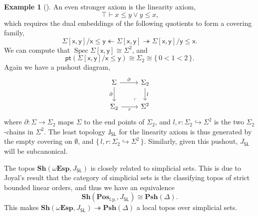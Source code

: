 \documentclass[a4paper,12pt]{amsart}
\theoremstyle{definition}
\newtheorem{example}[theorem]{Example}
\newcommand{\mb}[1]{\mathbf{#1}}
\newcommand{\mr}[1]{\mathrm{#1}}
\newcommand{\ms}[1]{\mathsf{#1}}
\newcommand{\Pos}{\mb{Pos}}
\newcommand{\sh}{\mb{Sh}}
\newcommand{\psh}{\mb{Psh}}
\newcommand{\set}[1]{\{\,#1\,\}}
\newcommand{\surj}{\twoheadrightarrow}
\newcommand{\hook}{\hookrightarrow}
\newcommand{\fp}{_{\mr{f.p.}}}
\newcommand{\emp}{\emptyset}
\newcommand{\pt}{\ms{pt}}
\newcommand{\wTop}{\omega\mb{Esp}}
\newcommand{\spec}{\operatorname{Spec}}
\begin{document}
\begin{example}[\AxiomSL]
  An even stronger axiom is the linearity axiom, 
  \[ \top \vdash x \le y \vee y \le x\text{,} \]
  which requires the dual embeddings of the following quotients to form a covering family,
  \[ \Sigma[\ms{x},\ms{y}]/\ms{x} \le \ms{y} \twoheadleftarrow \Sigma[\ms{x},\ms{y}] \surj \Sigma[\ms{x},\ms{y}]/\ms{y} \le \ms{x}\text{.} \]
  We can compute that $\spec \Sigma[\ms{x},\ms{y}] \cong \Sigma^2$, and 
  \[ \pt(\Sigma[\ms{x},\ms{y}]/\ms{x} \le \ms{y}) \cong \Sigma_2 \cong \set{0 < 1 < 2}\text{.} \]
  Again we have a pushout diagram,
  \[
  \begin{tikzcd}
    \Sigma \ar[r, "\partial"] \ar[d, "\partial"'] & \Sigma_2 \ar[d, "l"] \\ 
    \Sigma_2 \ar[r, "r"'] & \Sigma^2
    \arrow["\lrcorner"{anchor=center, pos=0.125, rotate=180}, draw=none, from=2-2, to=1-1]
  \end{tikzcd}
  \]
  where $\partial : \Sigma \to \Sigma_2$ maps $\Sigma$ to the end points of $\Sigma_2$, and $l,r : \Sigma_2 \hook \Sigma^2$ is the two $\Sigma_2$-chains in $\Sigma^2$. The least topology $\ms J_{\ms{SL}}$ for the linearity axiom is thus generated by the empty covering on $\emp$, and $\set{l,r : \Sigma_2 \hook \Sigma^2}$. Similarly, given this pushout, $J_{\ms{SL}}$ will be subcanonical.

  The topos $\sh(\wTop,J_{\ms{SL}})$ is closely related to simplicial sets. This is due to Joyal's result that the category of simplicial sets is the classifying topos of strict bounded linear orders, and thus we have an equivalence 
  \[ \sh(\Pos\fp,J_{\ms{SL}}) \cong \psh(\Delta)\text{.} \]
  This makes $\sh(\wTop,J_{\ms{SL}}) \surj \psh(\Delta)$ a local topos over simplicial sets.
\end{example}
\end{document}
